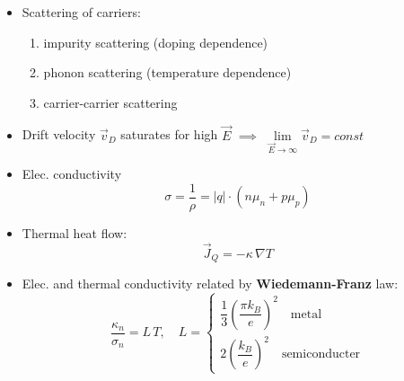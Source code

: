 \begin{itemize}
  \item Scattering of carriers:
        \begin{enumerate}
          \item impurity scattering (doping dependence)
          \item phonon scattering (temperature dependence)
          \item carrier-carrier scattering
        \end{enumerate}
        \item Drift velocity $\vec{v}_{D}$ saturates for high $\vec{E}$ $\implies$ $\lim\limits_{\vec{E} \to \infty} \vec{v}_{D} = const$
  \item Elec. conductivity
        \begin{equation*}
          \sigma = \dfrac{1}{\rho} = |q| \cdot (n\mu_{n} + p\mu_{p})
        \end{equation*}
  \item Thermal heat flow:
        \begin{equation*}
          \vec{J}_{Q} = -\kappa \, \nabla T
        \end{equation*}
  \item Elec. and thermal conductivity related by \textbf{Wiedemann-Franz} law:
        \begin{equation*}
          \dfrac{\kappa_{n}}{\sigma_{n}} = L \, T, \quad L = \begin{cases} \dfrac{1}{3}{\left(\dfrac{\pi k_{B}}{e}\right)}^{2} \quad \text{metal}\\ 2{\left(\dfrac{k_{B}}{e}\right)}^{2} \quad \text{semiconducter} \end{cases}
        \end{equation*}
\end{itemize}
